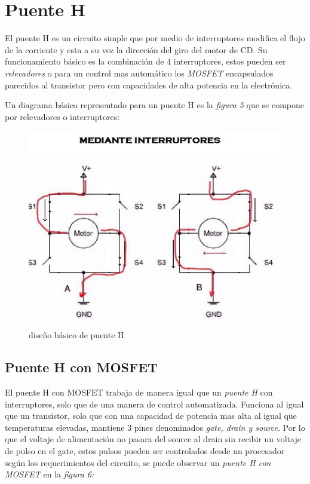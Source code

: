 \documentclass[11pt,a4paper]{article}
\begin{document}
\section{Puente H}

El puente H es un circuito simple que por medio de interruptores modifica el flujo de la corriente y esta a su vez la dirección del giro del motor de CD. Su funcionamiento básico es la combinación de 4 interruptores, estos pueden ser \emph{relevadores} o para un control mas automático los \emph{MOSFET} encapsulados parecidos al  transistor  pero con capacidades de alta potencia en la electrónica.

Un diagrama básico representado para un puente H es la \emph{figura 5} que se compone por relevadores o interruptores:

\begin{figure}[h]
\begin{center}
\includegraphics[scale=0.3]{5.png}
\caption{diseño básico de puente H}
\end{center}
\end{figure}

\newpage

\subsection{Puente H con MOSFET}

El puente H con MOSFET trabaja de manera igual que un \emph{puente H} con interruptores, solo que de una manera de control automatizada. Funciona al igual que un transistor, solo que con una capacidad de potencia mas alta al igual que temperaturas elevadas, mantiene 3 pines denominados \emph{gate, drain y source}. Por lo que el voltaje de alimentación no pasara del source al drain sin recibir un voltaje de pulso en el gate, estos pulsos pueden ser controlados desde un procesador según los requerimientos del circuito, se puede observar un \emph{puente H con MOSFET} en la \emph{figura 6:} \cite{ainversores}
\end{document}

